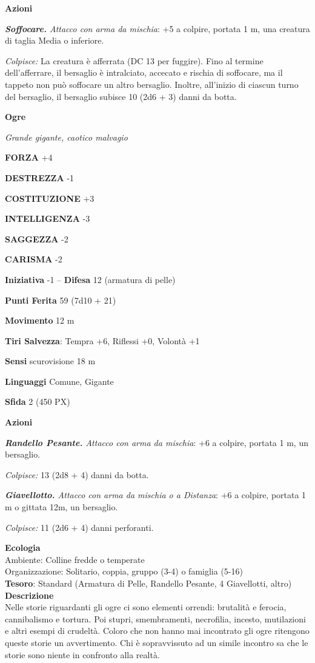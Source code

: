 \begin{multicols}{2}
	\textbf{Azioni}

	\textit{\textbf{Soffocare.} Attacco con arma da mischia}: +5 a colpire, portata 1 m, una creatura di taglia Media o inferiore.

	\textit{Colpisce:} La creatura è afferrata (DC 13 per fuggire). Fino al termine dell'afferrare, il bersaglio è intralciato, accecato e rischia di soffocare, ma il tappeto non può soffocare un altro bersaglio. Inoltre, all'inizio di ciascun turno del bersaglio, il bersaglio subisce 10 (2d6 + 3) danni da botta.

	\medskip{}\textbf{Ogre}

	\textit{Grande gigante, caotico malvagio}

	\textbf{FORZA} +4

	\textbf{DESTREZZA} -1

	\textbf{COSTITUZIONE} +3

	\textbf{INTELLIGENZA} -3

	\textbf{SAGGEZZA} -2

	\textbf{CARISMA} -2

	\textbf{Iniziativa} -1 -- \textbf{Difesa} 12 (armatura di pelle)

	\textbf{Punti Ferita} 59 (7d10 + 21)

	\textbf{Movimento} 12 m

	\textbf{Tiri Salvezza}: Tempra +6, Riflessi +0, Volontà +1

	\textbf{Sensi} scurovisione 18 m

	\textbf{Linguaggi} Comune, Gigante

	\textbf{Sfida} 2 (450 PX)

	\textbf{Azioni}

	\textit{\textbf{Randello Pesante.} Attacco con arma da mischia}: +6 a colpire, portata 1 m, un bersaglio.

	\textit{Colpisce:} 13 (2d8 + 4) danni da botta.

	\textit{\textbf{Giavellotto.} Attacco con arma da mischia o a Distanza}: +6 a colpire, portata 1 m o gittata 12m, un bersaglio.

	\textit{Colpisce:} 11 (2d6 + 4) danni perforanti.

	\textbf{Ecologia}\\
	Ambiente: Colline fredde o temperate\\
	Organizzazione: Solitario, coppia, gruppo (3-4) o famiglia (5-16)\\
	\textbf{Tesoro}: Standard (Armatura di Pelle, Randello Pesante, 4 Giavellotti, altro)\\
	\textbf{Descrizione}\\
	Nelle storie riguardanti gli ogre ci sono elementi orrendi: brutalità e ferocia, cannibalismo e tortura. Poi stupri, smembramenti, necrofilia, incesto, mutilazioni e altri esempi di crudeltà. Coloro che non hanno mai incontrato gli ogre ritengono queste storie un avvertimento. Chi è sopravvissuto ad un simile incontro sa che le storie sono niente in confronto alla realtà.


\end{multicols}
